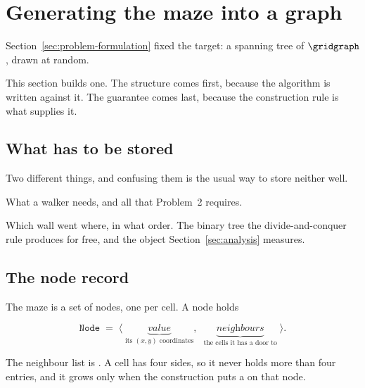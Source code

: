 \section{Generating the maze into a graph}
\label{sec:maze-generation}

Section~\ref{sec:problem-formulation} fixed the target: a spanning tree of
$\gridgraph$, drawn at random.

This section builds one. The structure comes first, because the algorithm is
written against it. The guarantee comes last, because the construction rule is
what supplies it.

\subsection{What has to be stored}

Two different things, and confusing them is the usual way to store neither well.

\begin{description}[leftmargin=*,style=nextline,itemsep=5pt]
  \item[The maze --- which doors exist.] What a walker needs, and all that
    Problem~2 requires.
  \item[The way it was built --- the region decomposition.] Which wall went
    where, in what order. The binary tree the divide-and-conquer rule produces
    for free, and the object Section~\ref{sec:analysis} measures.
\end{description}

\subsection{The node record}

The maze is a set of nodes, one per cell. A node holds

\[
  \texttt{Node} \;=\; \bigl\langle\;
    \underbrace{\textit{value}}_{\text{its }(x,y)\text{ coordinates}},\;\;
    \underbrace{\textit{neighbours}}_{\text{the cells it has a door to}}
  \;\bigr\rangle .
\]

The neighbour list is . A cell has four
sides, so it never holds more than four entries, and it grows only when the
construction puts a  on that node.

